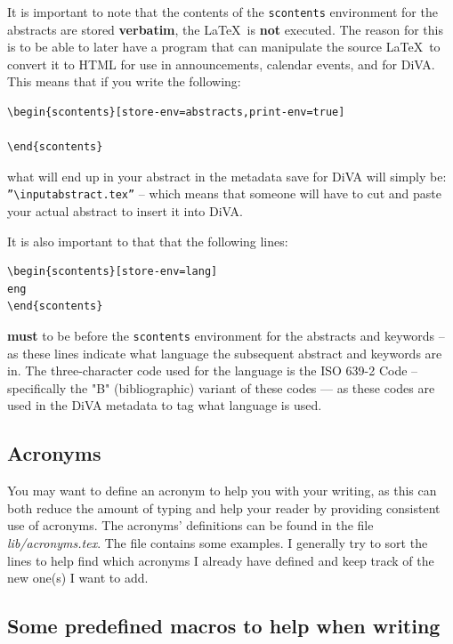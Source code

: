 \documentclass[main.tex]{subfiles}
\begin{document}
It is important to note that the contents of the \texttt{scontents} environment for the abstracts are stored \textbf{verbatim}, \ie the \LaTeX\  is \textbf{not} executed. The reason for this is to be able to later have a program that can manipulate the source \LaTeX\  to convert it to HTML for use in announcements, calendar events, and for DiVA. This means that if you write the following:
\begin{lstlisting}[style=latexExampleForAuthors]
\begin{scontents}[store-env=abstracts,print-env=true]

\end{scontents}
\end{lstlisting}
\noindent what will end up in your abstract in the metadata save for DiVA will simply be: \texttt{''\textbackslash input{abstract.tex}''} -- which means that someone will have to cut and paste your actual abstract to insert it into DiVA.

It is also important to that that the following lines:
\begin{lstlisting}[style=latexExampleForAuthors]
\begin{scontents}[store-env=lang]
eng
\end{scontents}
\end{lstlisting}
\noindent \textbf{must} to be before the \texttt{scontents} environment for the abstracts and keywords -- as these lines indicate what language the subsequent abstract and keywords are in. The three-character code used for the language is the ISO 639-2 Code – specifically the "B" (bibliographic) variant of these codes --- as these codes are used in the DiVA metadata to tag what language is used.

\subsection{Acronyms}
\label{sec:addingAcronyms}
You may want to define an acronym to help you with your writing, as this can both reduce the amount of typing and help your reader by providing consistent use of acronyms. The acronyms' definitions can be found in the file \textit{lib/acronyms.tex}. The file contains some examples. I generally try to sort the lines to help find which acronyms I already have defined and keep track of the new one(s) I want to add.

\subsection{Some predefined macros to help when writing}
\label{sec:predefine}
\end{document}
